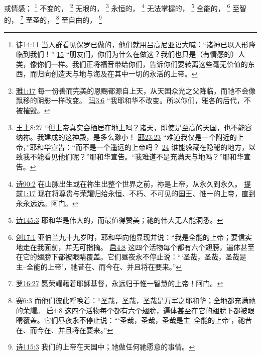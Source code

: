 \documentclass[12pt, a4paper, oneside]{ctexart}
\begin{document}
	或情感；
	\footnote {
		\href{https://biblehub.com/acts/14-11.htm}{徒14:11} 当人群看见保罗已做的，他们就用吕高尼亚语大喊：“诸神已以人形降临到我们！”
		\href{https://biblehub.com/acts/14-15.htm}{15} “朋友们，你们为什么在做这？我们也只是（有情感的）人类，像你们一样。我们正将福音带给你们，告诉你们要转离这些毫无价值的东西，而归向创造天与地与海及在其中一切的永活的上帝。
	}
	不变的，
	\footnote {
		\href{https://biblehub.com/james/1-17.htm}{雅1:17} 每一份善而完美的恩赐都源自上天，从天国众光之父降临，而祂不会像飘移的阴影一样改变。
		\href{https://biblehub.com/malachi/3-6.htm}{玛3:6} “我耶和华不改变。所以你们，雅各的后代，不被摧毁。
	}
	无垠的，
	\footnote {
		\href{https://biblehub.com/1_kings/8-27.htm}{王上8:27} “但上帝真实会栖居在地上吗？诸天，即使是至高的天国，也不能容纳祢。我建成的这神殿，是多么渺小！
		\href{https://biblehub.com/jeremiah/23-23.htm}{耶23:23} “难道我仅是一个附近的上帝，”耶和华宣告：“而不是一个遥远的上帝吗？
		\href{https://biblehub.com/jeremiah/23-24.htm}{24} 谁能躲藏在隐秘的地方，以致我不能看见他们呢？”耶和华宣告。“我难道不是充满天与地吗？”耶和华宣告。
	}
	永恒的，
	\footnote {
		\href{https://biblehub.com/psalms/90-2.htm}{诗90:2} 在山脉出生或在祢生出整个世界之前，祢是上帝，从永久到永久。
		\href{https://biblehub.com/1_timothy/1-17.htm}{提前1:17} 现在将尊贵与荣耀归给永恒、不朽、不可见的国王、惟一的上帝，直到永永远远。阿门。
	}
	无法掌握的，
	\footnote {
		\href{https://biblehub.com/psalms/145-3.htm}{诗145:3} 耶和华是伟大的，而最值得赞美；祂的伟大无人能洞悉。
	}
	全能的，
	\footnote {
		\href{https://biblehub.com/genesis/17-1.htm}{创17:1} 亚伯兰九十九岁时，耶和华向他显现并说：“我是全能的上帝；要信实地走在我面前，并无可指摘。
		\href{https://biblehub.com/revelation/4-8.htm}{启4:8} 这四个活物每个都有六个翅膀，遍体甚至在它的翅膀下都被眼睛覆盖。它们昼夜永不停止说：“‘圣哉，圣哉，圣哉是主--全能的上帝’，祂昔在、而今在、并且将在要来。”
	}
	至智的，
	\footnote {
		\href{https://biblehub.com/romans/16-27.htm}{罗16:27} 愿荣耀藉着耶稣基督，永远归于惟一智慧的上帝！阿门。
	}
	至圣的，
	\footnote {
		\href{https://biblehub.com/isaiah/6-3.htm}{赛6:3} 而他们彼此呼唤着：“圣哉，圣哉，圣哉是万军之耶和华；全地都充满祂的荣耀。
		\href{https://biblehub.com/revelation/4-8.htm}{启4:8} 这四个活物每个都有六个翅膀，遍体甚至在它的翅膀下都被眼睛覆盖。它们昼夜永不停止说：“‘圣哉，圣哉，圣哉是主--全能的上帝’，祂昔在、而今在、并且将在要来。”
	}
	至自由的，
	\footnote {
		\href{https://biblehub.com/psalms/115-3.htm}{诗115:3} 我们的上帝在天国中；祂做任何祂愿意的事情。
	}
\end{document}
